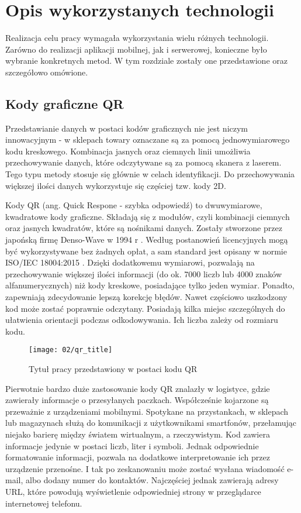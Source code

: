 \section{Opis wykorzystanych technologii}
Realizacja celu pracy wymagała wykorzystania wielu różnych technologii. Zarówno do realizacji aplikacji mobilnej, jak i serwerowej, konieczne było wybranie konkretnych metod. W tym rozdziale zostały one przedstawione oraz szczegółowo omówione.

\subsection{Kody graficzne QR}
Przedstawianie danych w postaci kodów graficznych nie jest niczym innowacyjnym - w sklepach towary oznaczane są za pomocą jednowymiarowego kodu kreskowego. Kombinacja jasnych oraz ciemnych linii umożliwia przechowywanie danych, które odczytywane są za pomocą skanera z laserem. Tego typu metody stosuje się głównie w celach identyfikacji. Do przechowywania większej ilości danych wykorzystuje się częściej tzw. kody 2D.

Kody QR (ang. Quick Respone - szybka odpowiedź) to dwuwymiarowe, kwadratowe kody graficzne. Składają się z modułów, czyli kombinacji ciemnych oraz jasnych kwadratów, które są nośnikami danych. Zostały stworzone przez japońską firmę Denso-Wave w 1994 r \cite{thonky_tutorial}. Według postanowień licencyjnych mogą być wykorzystywane bez żadnych opłat, a sam standard jest opisany w normie ISO/IEC 18004:2015 \cite{norma_qr}. Dzięki dodatkowemu wymiarowi, pozwalają na przechowywanie większej ilości informacji (do ok. 7000 liczb lub 4000 znaków alfanumerycznych) niż kody kreskowe, posiadające tylko jeden wymiar. Ponadto, zapewniają zdecydowanie lepszą korekcję błędów. Nawet częściowo uszkodzony kod może zostać poprawnie odczytany. Posiadają kilka miejsc szczególnych do ułatwienia orientacji podczas odkodowywania. Ich liczba zależy od rozmiaru kodu.

\begin{figure}[h]
	\begin{center}
		\texttt{[image: 02/qr\_title]}
	\end{center}
	\caption{Tytuł pracy przedstawiony w postaci kodu QR}
	\vspace{-0.3cm}
\end{figure}

Pierwotnie bardzo duże zastosowanie kody QR znalazły w logistyce, gdzie zawierały informacje o przesyłanych paczkach. Współcześnie kojarzone są przeważnie z urządzeniami mobilnymi. Spotykane na przystankach, w sklepach lub magazynach służą do komunikacji z użytkownikami smartfonów, przełamując niejako barierę między światem wirtualnym, a rzeczywistym. Kod zawiera informacje jedynie w postaci liczb, liter i symboli. Jednak odpowiednie formatowanie informacji, pozwala na dodatkowe interpretowanie ich przez urządzenie przenośne. I tak po zeskanowaniu może zostać wysłana wiadomość e-mail, albo dodany numer do kontaktów. Najczęściej jednak zawierają adresy URL, które powodują wyświetlenie odpowiedniej strony w przeglądarce internetowej telefonu.

